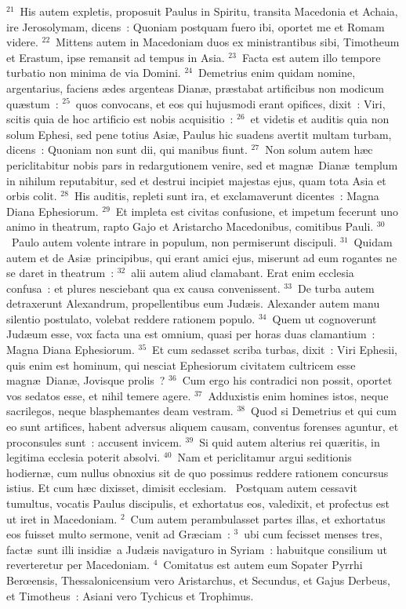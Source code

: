 ${}^{21}$~His autem expletis, proposuit Paulus in Spiritu, transita Macedonia et Achaia, ire Jerosolymam, dicens~: Quoniam postquam fuero ibi, oportet me et Romam videre.
${}^{22}$~Mittens autem in Macedoniam duos ex ministrantibus sibi, Timotheum et Erastum, ipse remansit ad tempus in Asia.
${}^{23}$~Facta est autem illo tempore turbatio non minima de via Domini.
${}^{24}$~Demetrius enim quidam nomine, argentarius, faciens \ae des argenteas Dian\ae , pr\ae stabat artificibus non modicum qu\ae stum~:
${}^{25}$~quos convocans, et eos qui hujusmodi erant opifices, dixit~: Viri, scitis quia de hoc artificio est nobis acquisitio~:
${}^{26}$~et videtis et auditis quia non solum Ephesi, sed pene totius Asi\ae , Paulus hic suadens avertit multam turbam, dicens~: Quoniam non sunt dii, qui manibus fiunt.
${}^{27}$~Non solum autem h\ae c periclitabitur nobis pars in redargutionem venire, sed et magn\ae\ Dian\ae\ templum in nihilum reputabitur, sed et destrui incipiet majestas ejus, quam tota Asia et orbis colit.
${}^{28}$~His auditis, repleti sunt ira, et exclamaverunt dicentes~: Magna Diana Ephesiorum.
${}^{29}$~Et impleta est civitas confusione, et impetum fecerunt uno animo in theatrum, rapto Gajo et Aristarcho Macedonibus, comitibus Pauli.
${}^{30}$~Paulo autem volente intrare in populum, non permiserunt discipuli.
${}^{31}$~Quidam autem et de Asi\ae\ principibus, qui erant amici ejus, miserunt ad eum rogantes ne se daret in theatrum~:
${}^{32}$~alii autem aliud clamabant. Erat enim ecclesia confusa~: et plures nesciebant qua ex causa convenissent.
${}^{33}$~De turba autem detraxerunt Alexandrum, propellentibus eum Jud\ae is. Alexander autem manu silentio postulato, volebat reddere rationem populo.
${}^{34}$~Quem ut cognoverunt Jud\ae um esse, vox facta una est omnium, quasi per horas duas clamantium~: Magna Diana Ephesiorum.
${}^{35}$~Et cum sedasset scriba turbas, dixit~: Viri Ephesii, quis enim est hominum, qui nesciat Ephesiorum civitatem cultricem esse magn\ae\ Dian\ae , Jovisque prolis~?
${}^{36}$~Cum ergo his contradici non possit, oportet vos sedatos esse, et nihil temere agere.
${}^{37}$~Adduxistis enim homines istos, neque sacrilegos, neque blasphemantes deam vestram.
${}^{38}$~Quod si Demetrius et qui cum eo sunt artifices, habent adversus aliquem causam, conventus forenses aguntur, et proconsules sunt~: accusent invicem.
${}^{39}$~Si quid autem alterius rei qu\ae ritis, in legitima ecclesia poterit absolvi.
${}^{40}$~Nam et periclitamur argui seditionis hodiern\ae , cum nullus obnoxius sit de quo possimus reddere rationem concursus istius. Et cum h\ae c dixisset, dimisit ecclesiam.
~\lettrine[lines=10,image=true,loversize=0.05,lraise=-0.03]{P}{}ostquam autem cessavit tumultus, vocatis Paulus discipulis, et exhortatus eos, valedixit, et profectus est ut iret in Macedoniam.
${}^{2}$~Cum autem perambulasset partes illas, et exhortatus eos fuisset multo sermone, venit ad Gr\ae ciam~:
${}^{3}$~ubi cum fecisset menses tres, fact\ae\ sunt illi insidi\ae\ a Jud\ae is navigaturo in Syriam~: habuitque consilium ut reverteretur per Macedoniam.
${}^{4}$~Comitatus est autem eum Sopater Pyrrhi Berœensis, Thessalonicensium vero Aristarchus, et Secundus, et Gajus Derbeus, et Timotheus~: Asiani vero Tychicus et Trophimus.


